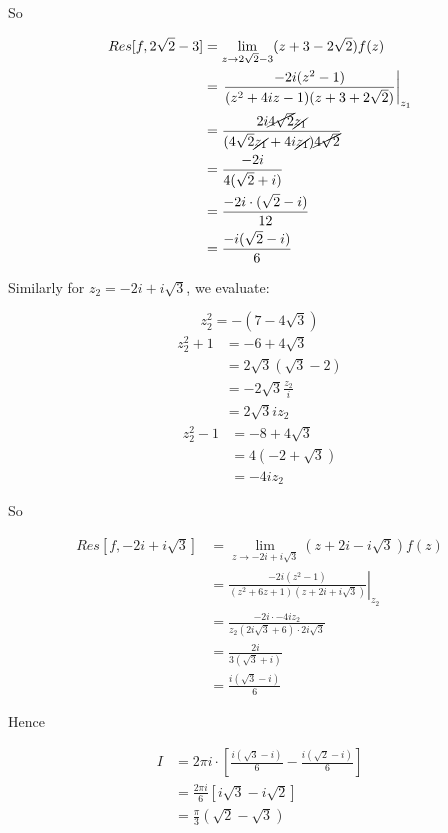 \documentclass{physics_notes}
\begin{document}
\begin{example}{}
\begin{enumerate}
{ 	So

 	\begin{align*}
 		Res[f, 2\sqrt{2} - 3] &= \lim_{z\to 2\sqrt{2} - 3} (z + 3 - 2\sqrt{2})f(z) \\
 		&= \left.\frac{-2i(z^2 - 1)}{(z^2 + 4iz - 1)(z + 3 + 2\sqrt{2})}\right|_{z_1} \\
 		&= \frac{2i \cancel{4\sqrt{2}}\cancel{z_1}}{(4\sqrt{2}\cancel{z_1} + 4i\cancel{z_1})\cancel{4\sqrt{2}}} \\
 		&= \frac{-2i}{4(\sqrt{2} + i)} \\
 		&= \frac{-2i \cdot (\sqrt{2} - i)}{12} \\
 		&= \frac{-i(\sqrt{2} - i)}{6}
	\end{align*}

	Similarly for $z_2 = -2i + i\sqrt{3}$, we evaluate:

	\[
	 	z_2^2 = -(7-4\sqrt{3})
 	\] 
 	\begin{align*}
 		z_2^2 + 1 &= -6 + 4\sqrt{3} \\
 		&= 2\sqrt{3}(\sqrt{3} - 2) \\
 		&= -2\sqrt{3}\frac{z_2}{i} \\
 		&= 2\sqrt{3}iz_2
 	\end{align*}
 	\begin{align*}
 		z_2^2 - 1 &= -8 + 4\sqrt{3} \\
 		&= 4(-2 + \sqrt{3}) \\
 		&= -4iz_2
 	\end{align*}

 	So 

 	\begin{align*}
 	Res[f,-2i + i\sqrt{3}] &= \lim_{z\to -2i + i\sqrt{3}} (z + 2i - i\sqrt{3})f(z) \\
 	&= \left.\frac{-2i(z^2 - 1)}{(z^2 + 6z + 1)(z + 2i + i\sqrt{3})}\right|_{z_2} \\
 	&= \frac{-2i \cdot -4iz_2}{z_2 (2i\sqrt{3} + 6)\cdot 2i\sqrt{3}} \\
 	&= \frac{2i}{3(\sqrt{3} + i)} \\
 	&= \frac{i(\sqrt{3} - i)}{6}
 	\end{align*}

 	Hence 

 	\begin{align*}
 	I &= 2\pi i \cdot \left[\frac{i(\sqrt{3} - i)}{6} - \frac{i(\sqrt{2}-i)}{6}\right] \\
 	&= \frac{2\pi i}{6}\left[i\sqrt{3} - i\sqrt{2}\right] \\
 	&= \frac{\pi}{3}(\sqrt{2} - \sqrt{3})
 	\end{align*}
}

\end{enumerate}
\end{example}
\end{document}
